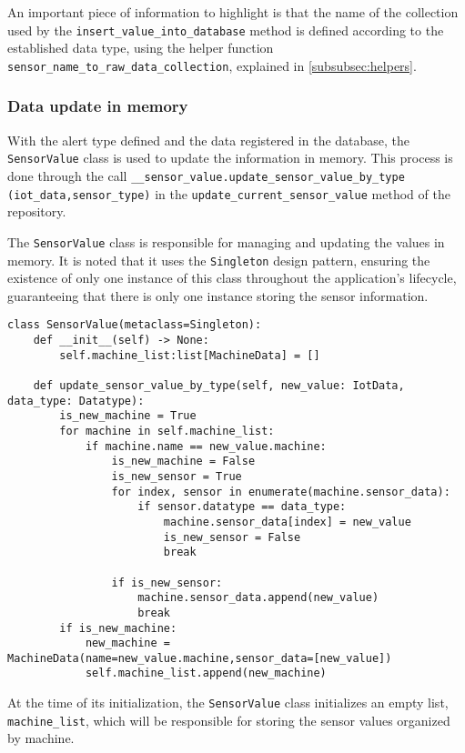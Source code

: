 An important piece of information to highlight is that the name of the collection used by the \texttt{insert\_value\_into\_database} method is defined according to the established data type, using the helper function \texttt{sensor\_name\_to\_raw\_data\_collection}, explained in \ref{subsubsec:helpers}.

\subsubsection{Data update in memory}

With the alert type defined and the data registered in the database, the \texttt{SensorValue} class is used to update the information in memory. This process is done through the call \texttt{\_\_sensor\_value.update\_sensor\_value\_by\_type (iot\_data,sensor\_type)} in the \texttt{update\_current\_sensor\_value} method of the repository.

The \texttt{SensorValue} class is responsible for managing and updating the values in memory. It is noted that it uses the \texttt{Singleton} design pattern, ensuring the existence of only one instance of this class throughout the application's lifecycle, guaranteeing that there is only one instance storing the sensor information.

\begin{Verbatim}[fontsize=\small, baselinestretch=0.8]
class SensorValue(metaclass=Singleton):
    def __init__(self) -> None:
        self.machine_list:list[MachineData] = []

    def update_sensor_value_by_type(self, new_value: IotData, data_type: Datatype):
        is_new_machine = True
        for machine in self.machine_list:
            if machine.name == new_value.machine:
                is_new_machine = False
                is_new_sensor = True
                for index, sensor in enumerate(machine.sensor_data):
                    if sensor.datatype == data_type:
                        machine.sensor_data[index] = new_value
                        is_new_sensor = False
                        break

                if is_new_sensor:
                    machine.sensor_data.append(new_value)
                    break
        if is_new_machine:
            new_machine = MachineData(name=new_value.machine,sensor_data=[new_value])
            self.machine_list.append(new_machine)
\end{Verbatim}

At the time of its initialization, the \texttt{SensorValue} class initializes an empty list, \texttt{machine\_list}, which will be responsible for storing the sensor values organized by machine.

